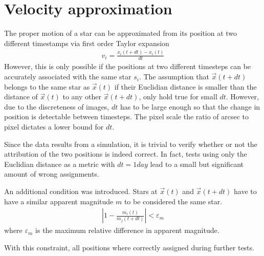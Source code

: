 \documentclass[letterpaper,10pt,english]{sphinxmanual}
\begin{document}
\section{Velocity approximation}
\label{\detokenize{NBodySimulation/Clustering:velocity-approximation}}
\sphinxAtStartPar
The proper motion of a star can be approximated from its position at two different timestamps via first order Taylor expansion
\begin{equation*}
\begin{split}v_{i} = \frac{x_{i}\left ( t+dt \right )-x_{i}\left ( t \right )}{dt}\end{split}
\end{equation*}
\sphinxAtStartPar
However, this is only possible if the positions at two different timesteps can be accurately associated with the same star \(s_{i}\).
The assumption that \(\vec{x}(t+dt)\) belongs to the same star as \(\vec{x}(t)\) if their Euclidian distance is smaller than the distance of \(\vec{x}(t)\) to any other \(\vec{x}(t+dt)\),
only hold true for small \(dt\). However, due to the discreteness of images, \(dt\) has to be large enough so that the change in position is detectable between timesteps.
The pixel scale \sphinxhyphen{} the ratio of arcsec to pixel \sphinxhyphen{} dictates a lower bound for \(dt\).

\sphinxAtStartPar
Since the data results from a simulation, it is trivial to verify whether or not the attribution of the two positions is indeed correct.
In fact, tests using only the Euclidian distance as a metric with \(dt = 1 day\) lead to a small but significant amount of wrong assignments.

\sphinxAtStartPar
An additional condition was introduced. Stars at \(\vec{x}(t)\) and \(\vec{x}(t+dt)\) have to have a similar apparent magnitude \(m\) to be considered the same star.
\begin{equation*}
\begin{split}\left | 1-\frac{m_{i}\left ( t \right )}{m_{j}\left ( t+dt \right )} \right | < \varepsilon_{m}\end{split}
\end{equation*}
\sphinxAtStartPar
where \(\varepsilon_{m}\) is the maximum relative difference in apparent magnitude.

\sphinxAtStartPar
With this constraint, all positions where correctly assigned during further tests.
\end{document}
